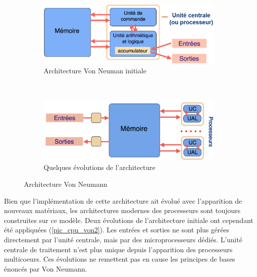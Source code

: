 \begin{figure}
    \centering
    \begin{subfigure}[b]{0.45\linewidth}
        \includegraphics[width=\linewidth]{images/cpu_von1.png}
        \caption{Architecture Von Neuman initiale}
        \label{pic_cpu_von}
    \end{subfigure}
    ~ %
    \begin{subfigure}[b]{0.45\linewidth}
        \includegraphics[width=\linewidth]{images/cpu_von_new.png}
        \caption{Quelques évolutions de l'architecture}
        \label{pic_cpu_von2}
    \end{subfigure}
    \caption{Architecture Von Neumann\protect\footnotemark }\label{fig:cpu_archi_von}
\end{figure}


Bien que l’implémentation de cette architecture ait évolué avec l’apparition de nouveaux matériaux, les architectures modernes des processeurs sont toujours construites sur ce modèle. Deux évolutions de l’architecture initiale ont cependant été appliquées (\autoref{pic_cpu_von2}). Les entrées et sorties ne sont plus gérées directement par l’unité centrale, mais par des microprocesseurs dédiés. L’unité centrale de traitement n’est plus unique depuis l’apparition des processeurs multicoeurs. Ces évolutions ne remettent pas en cause les principes de bases énoncés par Von Neumann. 


